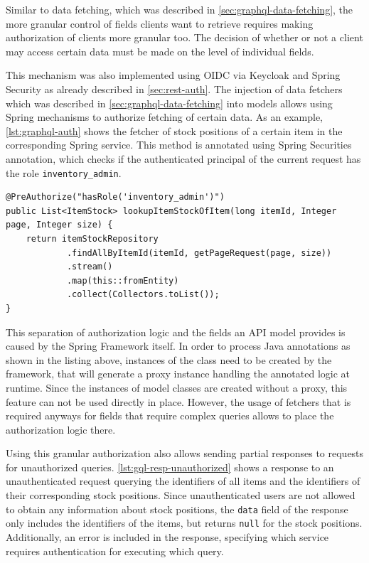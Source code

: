 Similar to data fetching, which was described in \autoref{sec:graphql-data-fetching}, the more granular control of fields clients want to retrieve requires making authorization of clients more granular too.
The decision of whether or not a client may access certain data must be made on the level of individual fields.

This mechanism was also implemented using \ac{OIDC} via Keycloak and Spring Security as already described in \autoref{sec:rest-auth}.
The injection of data fetchers which was described in \autoref{sec:graphql-data-fetching} into models allows using Spring mechanisms to authorize fetching of certain data.
As an example, \autoref{lst:graphql-auth} shows the fetcher of stock positions of a certain item in the corresponding Spring service.
This method is annotated using Spring Securities annotation, which checks if the authenticated principal of the current request has the role \texttt{inventory\_admin}.

\begin{lstlisting}[caption={Authorization for Retrieval of Individual Fields}, style=java-ext, label={lst:graphql-auth}]
@PreAuthorize("hasRole('inventory_admin')")
public List<ItemStock> lookupItemStockOfItem(long itemId, Integer page, Integer size) {
    return itemStockRepository
            .findAllByItemId(itemId, getPageRequest(page, size))
            .stream()
            .map(this::fromEntity)
            .collect(Collectors.toList());
}
\end{lstlisting}

This separation of authorization logic and the fields an \ac{API} model provides is caused by the Spring Framework itself.
In order to process Java annotations as shown in the listing above, instances of the class need to be created by the framework, that will generate a proxy instance handling the annotated logic at runtime.
Since the instances of model classes are created without a proxy, this feature can not be used directly in place.
However, the usage of fetchers that is required anyways for fields that require complex queries allows to place the authorization logic there.

Using this granular authorization also allows sending partial responses to requests for unauthorized queries.
\autoref{lst:gql-resp-unauthorized} shows a response to an unauthenticated request querying the identifiers of all items and the identifiers of their corresponding stock positions.
Since unauthenticated users are not allowed to obtain any information about stock positions, the \texttt{data} field of the response only includes the identifiers of the items, but returns \texttt{null} for the stock positions.
Additionally, an error is included in the response, specifying which service requires authentication for executing which query.

